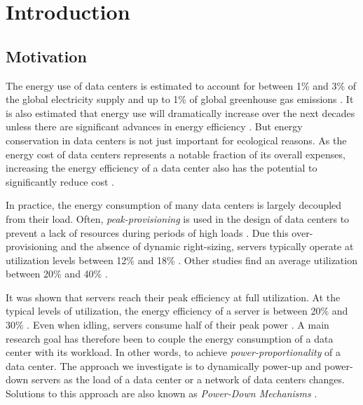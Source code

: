 
\chapter{Introduction}\label{chapter:introduction}

\section{Motivation}

The energy use of data centers is estimated to account for between 1\% and 3\% of the global electricity supply and up to 1\% of global greenhouse gas emissions \cite{Shehabi2016, Jones2018, Bashroush2020, Masanet2020}. It is also estimated that energy use will dramatically increase over the next decades unless there are significant advances in energy efficiency \cite{Jones2018}. But energy conservation in data centers is not just important for ecological reasons. As the energy cost of data centers represents a notable fraction of its overall expenses, increasing the energy efficiency of a data center also has the potential to significantly reduce cost \cite{Barroso2007, Brill2007, Hamilton2008}.

In practice, the energy consumption of many data centers is largely decoupled from their load. Often, \textit{peak-provisioning} is used in the design of data centers to prevent a lack of resources during periods of high loads \cite{Whitney2014}. Due this over-provisioning and the absence of dynamic right-sizing, servers typically operate at utilization levels between 12\% and 18\% \cite{Whitney2014}. Other studies find an average utilization between 20\% and 40\% \cite{Barroso2007, Armbrust2010}.

It was shown that servers reach their peak efficiency at full utilization. At the typical levels of utilization, the energy efficiency of a server is between 20\% and 30\% \cite{Barroso2007}. Even when idling, servers consume half of their peak power \cite{Barroso2007}. A main research goal has therefore been to couple the energy consumption of a data center with its workload. In other words, to achieve \textit{power-proportionality} of a data center. The approach we investigate is to dynamically power-up and power-down servers as the load of a data center or a network of data centers changes. Solutions to this approach are also known as \textit{Power-Down Mechanisms} \cite{Jin2016}.

